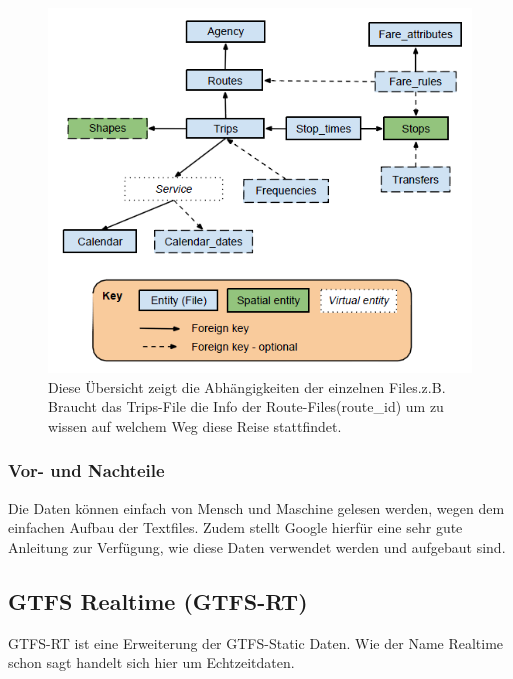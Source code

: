 \documentclass[a4paper,12pt]{scrartcl}
\begin{document}
\begin{figure}[]
	\centering
	\includegraphics[scale=0.75]{img/GTFS_data_model_diagram.png}
 	\caption{Diese Übersicht zeigt die Abhängigkeiten der einzelnen Files.z.B. Braucht das Trips-File die Info der Route-Files(route\_id) um zu wissen auf welchem Weg diese Reise stattfindet.  \cite{gtfsUebersicht}}
	\label{fig:gtfs-uebersicht}
\end{figure}

 

\subsubsection{Vor- und Nachteile}
\label{sec:gtfs-vornachteile}
Die Daten können einfach von Mensch und Maschine gelesen werden, wegen dem einfachen Aufbau der Textfiles. Zudem stellt Google hierfür eine sehr gute Anleitung zur Verfügung, wie diese Daten verwendet werden und aufgebaut sind.

\subsection{GTFS Realtime (GTFS-RT)}
\label{sec:gtfs-rt}
GTFS-RT ist eine Erweiterung der GTFS-Static Daten. Wie der Name Realtime schon sagt handelt sich hier um Echtzeitdaten. 
\end{document}
